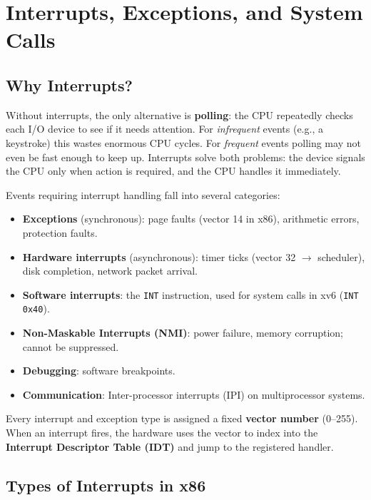 \documentclass[11pt]{article}
\begin{document}
\section{Interrupts, Exceptions, and System Calls}

\subsection{Why Interrupts?}

Without interrupts, the only alternative is \textbf{polling}: the CPU repeatedly checks each I/O device to see if it needs attention. For \emph{infrequent} events (e.g., a keystroke) this wastes enormous CPU cycles. For \emph{frequent} events polling may not even be fast enough to keep up. Interrupts solve both problems: the device signals the CPU only when action is required, and the CPU handles it immediately.

Events requiring interrupt handling fall into several categories:
\begin{itemize}
    \item \textbf{Exceptions} (synchronous): page faults (vector 14 in x86), arithmetic errors, protection faults.
    \item \textbf{Hardware interrupts} (asynchronous): timer ticks (vector 32 $\to$ scheduler), disk completion, network packet arrival.
    \item \textbf{Software interrupts}: the \texttt{INT} instruction, used for system calls in xv6 (\texttt{INT 0x40}).
    \item \textbf{Non-Maskable Interrupts (NMI)}: power failure, memory corruption; cannot be suppressed.
    \item \textbf{Debugging}: software breakpoints.
    \item \textbf{Communication}: Inter-processor interrupts (IPI) on multiprocessor systems.
\end{itemize}

Every interrupt and exception type is assigned a fixed \textbf{vector number} (0--255). When an interrupt fires, the hardware uses the vector to index into the \textbf{Interrupt Descriptor Table (IDT)} and jump to the registered handler.

\subsection{Types of Interrupts in x86}
\end{document}
